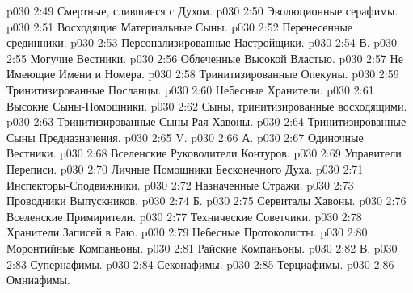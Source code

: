 \vs p030 2:49 \bibnobreakspace Смертные, слившиеся с Духом.
\vs p030 2:50 \bibnobreakspace Эволюционные серафимы.
\vs p030 2:51 \bibnobreakspace Восходящие Материальные Сыны.
\vs p030 2:52 \bibnobreakspace Перенесенные срединники.
\vs p030 2:53 \bibnobreakspace Персонализированные Настройщики.
\vs p030 2:54 \pc В. 
\vs p030 2:55 \bibnobreakspace Могучие Вестники.
\vs p030 2:56 \bibnobreakspace Облеченные Высокой Властью.
\vs p030 2:57 \bibnobreakspace Не Имеющие Имени и Номера.
\vs p030 2:58 \bibnobreakspace Тринитизированные Опекуны.
\vs p030 2:59 \bibnobreakspace Тринитизированные Посланцы.
\vs p030 2:60 \bibnobreakspace Небесные Хранители.
\vs p030 2:61 \bibnobreakspace Высокие Сыны\hyp{}Помощники.
\vs p030 2:62 \bibnobreakspace Сыны, тринитизированные восходящими.
\vs p030 2:63 \bibnobreakspace Тринитизированные Сыны Рая\hyp{}Хавоны.
\vs p030 2:64 \bibnobreakspace Тринитизированные Сыны Предназначения.
\vs p030 2:65 \pc V. 
\vs p030 2:66 \pc А. 
\vs p030 2:67 \bibnobreakspace Одиночные Вестники.
\vs p030 2:68 \bibnobreakspace Вселенские Руководители Контуров.
\vs p030 2:69 \bibnobreakspace Управители Переписи.
\vs p030 2:70 \bibnobreakspace Личные Помощники Бесконечного Духа.
\vs p030 2:71 \bibnobreakspace Инспекторы\hyp{}Сподвижники.
\vs p030 2:72 \bibnobreakspace Назначенные Стражи.
\vs p030 2:73 \bibnobreakspace Проводники Выпускников.
\vs p030 2:74 \pc Б. 
\vs p030 2:75 \bibnobreakspace Сервиталы Хавоны.
\vs p030 2:76 \bibnobreakspace Вселенские Примирители.
\vs p030 2:77 \bibnobreakspace Технические Советчики.
\vs p030 2:78 \bibnobreakspace Хранители Записей в Раю.
\vs p030 2:79 \bibnobreakspace Небесные Протоколисты.
\vs p030 2:80 \bibnobreakspace Моронтийные Компаньоны.
\vs p030 2:81 \bibnobreakspace Райские Компаньоны.
\vs p030 2:82 \pc В. 
\vs p030 2:83 \bibnobreakspace Супернафимы.
\vs p030 2:84 \bibnobreakspace Секонафимы.
\vs p030 2:85 \bibnobreakspace Терциафимы.
\vs p030 2:86 \bibnobreakspace Омниафимы.
